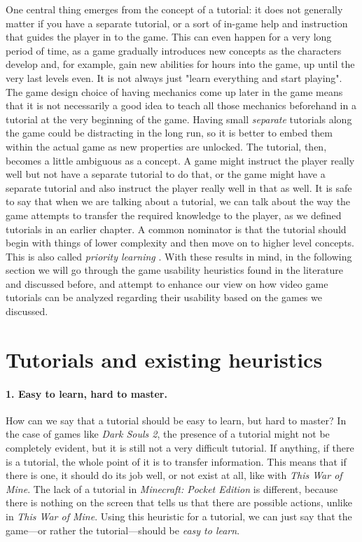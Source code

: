 One central thing emerges from the concept of a tutorial: it does not generally matter if you have a separate tutorial, or a sort of in-game help and instruction that guides the player in to the game. This can even happen for a very long period of time, as a game gradually introduces new concepts as the characters develop and, for example, gain new abilities for hours into the game, up until the very last levels even. It is not always just "learn everything and start playing". The game design choice of having mechanics come up later in the game means that it is not necessarily a good idea to teach all those mechanics beforehand in a tutorial at the very beginning of the game. Having small \textit{separate} tutorials along the game could be distracting in the long run, so it is better to embed them within the actual game as new properties are unlocked. The tutorial, then, becomes a little ambiguous as a concept. A game might instruct the player really well but not have a separate tutorial to do that, or the game might have a separate tutorial and also instruct the player really well in that as well. It is safe to say that when we are talking about a tutorial, we can talk about the way the game attempts to transfer the required knowledge to the player, as we defined tutorials in an earlier chapter. A common nominator is that the tutorial should begin with things of lower complexity and then move on to higher level concepts. This is also called \textit{priority learning} \cite{Bycer2016}. With these results in mind, in the following section we will go through the game usability heuristics found in the literature and discussed before, and attempt to enhance our view on how video game tutorials can be analyzed regarding their usability based on the games we discussed.

\section{Tutorials and existing heuristics}
\paragraph{1. Easy to learn, hard to master.} How can we say that a tutorial should be easy to learn, but hard to master? In the case of games like \textit{Dark Souls 2}, the presence of a tutorial might not be completely evident, but it is still not a very difficult tutorial. If anything, if there is a tutorial, the whole point of it is to transfer information. This means that if there is one, it should do its job well, or not exist at all, like with \textit{This War of Mine}. The lack of a tutorial in \textit{Minecraft: Pocket Edition} is different, because there is nothing on the screen that tells us that there are possible actions, unlike in \textit{This War of Mine}. Using this heuristic for a tutorial, we can just say that the game---or rather the tutorial---should be \textit{easy to learn}.

